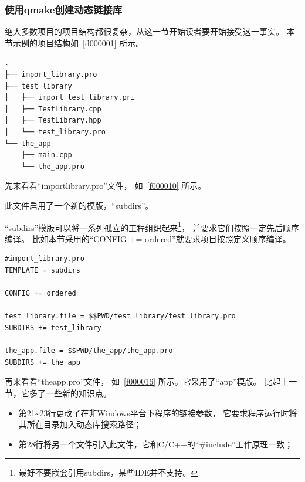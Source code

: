 %
% 

\subsubsection{
使用qmake创建动态链接库
}\label{ss000710}


绝大多数项目的项目结构都很复杂，从这一节开始读者要开始接受这一事实。
本节示例的项目结构如\treeindexnumbernameone\ \ref{d000001}
所示。

\label{d000001}    %
\begin{lstlisting}[caption=GoodLuck,
numbers=none,
title=\treeindexnumbernameone \thetreeindexnumber
]
.
├── import_library.pro
├── test_library
│   ├── import_test_library.pri
│   ├── TestLibrary.cpp
│   ├── TestLibrary.hpp
│   └── test_library.pro
└── the_app
    ├── main.cpp
    └── the_app.pro
\end{lstlisting}          %


先来看看“import\underline{\hspace{0.5em}}library.pro”文件，
如\lstlistingname\ \ref{f000010}
所示。

此文件启用了一个新的模版，“subdirs”。

“subdirs”模版可以将一系列孤立的工程组织起来\footnote{
最好不要嵌套引用subdirs，某些IDE并不支持。
}，
并要求它们按照一定先后顺序编译。
比如本节采用的“CONFIG {\sourcefonttwo{}+}{\sourcefonttwo{}=} ordered”就要求项目按照定义顺序编译。

\begin{lstlisting}[label=f000010,
caption=GoodLuck,
title=\lstlistingname\ \thelstlisting
]
#import_library.pro
TEMPLATE = subdirs

CONFIG += ordered

test_library.file = $$PWD/test_library/test_library.pro
SUBDIRS += test_library

the_app.file = $$PWD/the_app/the_app.pro
SUBDIRS += the_app
\end{lstlisting}          %


再来看看“the\underline{\hspace{0.5em}}app.pro”文件，
如\lstlistingname\ \ref{f000016} 所示。它采用了“app”模版。
比起上一节，它多了一些新的知识点。
\begin{itemize}
\item 第21{\sourcefonttwo\~{}}23行更改了在非Windows平台下程序的链接参数，
它要求程序运行时将其所在目录加入动态库搜索路径；
\item 第28行将另一个文件引入此文件，它和C/C{\sourcefonttwo{}+}{\sourcefonttwo{}+}的“{\sourcefonttwo\#}include”工作原理一致；
\end{itemize}


